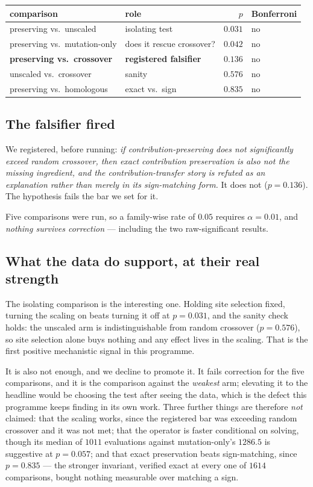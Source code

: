 \documentclass[11pt,a4paper]{article}
\theoremstyle{definition}
\theoremstyle{remark}
\begin{document}
\begin{center}
\begin{tabular}{llrl}
\toprule
comparison & role & $p$ & Bonferroni \\
\midrule
preserving vs.\ unscaled & isolating test & $0.031$ & no \\
preserving vs.\ mutation-only & does it rescue crossover? & $0.042$ & no \\
\textbf{preserving vs.\ crossover} & \textbf{registered falsifier} & $\mathbf{0.136}$ & no \\
unscaled vs.\ crossover & sanity & $0.576$ & no \\
preserving vs.\ homologous & exact vs.\ sign & $0.835$ & no \\
\bottomrule
\end{tabular}
\end{center}

\subsection{The falsifier fired}

We registered, before running: \emph{if contribution-preserving does not
significantly exceed random crossover, then exact contribution preservation is
also not the missing ingredient, and the contribution-transfer story is refuted
as an explanation rather than merely in its sign-matching form.} It does not
($p = 0.136$). The hypothesis fails the bar we set for it.

Five comparisons were run, so a family-wise rate of $0.05$ requires
$\alpha = 0.01$, and \emph{nothing survives correction} --- including the two
raw-significant results.

\subsection{What the data do support, at their real strength}

The isolating comparison is the interesting one. Holding site selection fixed,
turning the scaling on beats turning it off at $p = 0.031$, and the sanity check
holds: the unscaled arm is indistinguishable from random crossover
($p = 0.576$), so site selection alone buys nothing and any effect lives in the
scaling. That is the first positive mechanistic signal in this programme.

It is also not enough, and we decline to promote it. It fails correction for the
five comparisons, and it is the comparison against the \emph{weakest} arm;
elevating it to the headline would be choosing the test after seeing the data,
which is the defect this programme keeps finding in its own work. Three further
things are therefore \emph{not} claimed: that the scaling works, since the
registered bar was exceeding random crossover and it was not met; that the
operator is faster conditional on solving, though its median of $1011$
evaluations against mutation-only's $1286.5$ is suggestive at $p = 0.057$; and
that exact preservation beats sign-matching, since $p = 0.835$ --- the stronger
invariant, verified exact at every one of $1614$ comparisons, bought nothing
measurable over matching a sign.
\end{document}
